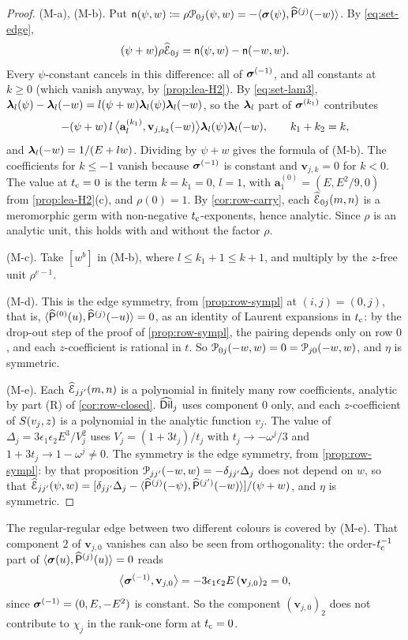 \begin{proof}
(M-a), (M-b). Put $\mathsf{n}(\psi,w)\coloneqq\rho\mathcal{P}_{0j}(\psi,w)=-\langle\boldsymbol{\sigma}(\psi),\widehat{\mathsf{P}}^{(j)}(-w)\rangle$. By \cref{eq:set-edge},
\[
(\psi+w)\rho\widehat{\mathcal{E}}_{0j}=\mathsf{n}(\psi,w)-\mathsf{n}(-w,w).
\]
Every $\psi$-constant cancels in this difference: all of $\boldsymbol{\sigma}^{(-1)}$, and all constants at $k\ge0$ (which vanish anyway, by \cref{prop:lea-H2}). By \cref{eq:set-lam3}, $\boldsymbol{\lambda}_l(\psi)-\boldsymbol{\lambda}_l(-w)=l(\psi+w)\boldsymbol{\lambda}_l(\psi)\boldsymbol{\lambda}_l(-w)$, so the $\boldsymbol{\lambda}_l$ part of $\boldsymbol{\sigma}^{(k_1)}$ contributes
\[
-(\psi+w)\,l\,\bigl\langle\mathbf{a}_l^{(k_1)},\mathbf{v}_{j,k_2}(-w)\bigr\rangle\boldsymbol{\lambda}_l(\psi)\boldsymbol{\lambda}_l(-w),\qquad k_1+k_2=k,
\]
and $\boldsymbol{\lambda}_l(-w)=1/(E+lw)$. Dividing by $\psi+w$ gives the formula of (M-b). The coefficients for $k\le-1$ vanish because $\boldsymbol{\sigma}^{(-1)}$ is constant and $\mathbf{v}_{j,k}=0$ for $k<0$. The value at $t_{\mathrm{c}}=0$ is the term $k=k_1=0$, $l=1$, with $\mathbf{a}_1^{(0)}=(E,E^2/9,0)$ from \cref{prop:lea-H2}(c), and $\rho(0)=1$. By \cref{cor:row-carry}, each $\widehat{\mathcal{E}}_{0j}(m,n)$ is a meromorphic germ with non-negative $t_{\mathrm{c}}$-exponents, hence analytic. Since $\rho$ is an analytic unit, this holds with and without the factor $\rho$.

(M-c). Take $[w^b]$ in (M-b), where $l\le k_1+1\le k+1$, and multiply by the $z$-free unit $\rho^{e-1}$.

(M-d). This is the edge symmetry, from \cref{prop:row-sympl} at $(i,j)=(0,j)$, that is, $\langle\widehat{\mathsf{P}}^{(0)}(u),\widehat{\mathsf{P}}^{(j)}(-u)\rangle=0$, as an identity of Laurent expansions in $t_{\mathrm{c}}$: by the drop-out step of the proof of \cref{prop:row-sympl}, the pairing depends only on row $0$, and each $z$-coefficient is rational in $t$. So $\mathcal{P}_{0j}(-w,w)=0=\mathcal{P}_{j0}(-w,w)$, and $\eta$ is symmetric.

(M-e). Each $\widehat{\mathcal{E}}_{jj'}(m,n)$ is a polynomial in finitely many row coefficients, analytic by part (R) of \cref{cor:row-closed}. $\widehat{\mathsf{Dil}}_j$ uses component $0$ only, and each $z$-coefficient of $S(v_j,z)$ is a polynomial in the analytic function $v_j$. The value of $\Delta_j=3\epsilon_1\epsilon_2E^3/V_j^2$ uses $V_j=(1+3t_j)/t_j$ with $t_j\to-\omega^j/3$ and $1+3t_j\to1-\omega^j\neq0$. The symmetry is the edge symmetry, from \cref{prop:row-sympl}: by that proposition $\mathcal{P}_{jj'}(-w,w)=-\delta_{jj'}\Delta_j$ does not depend on $w$, so that $\widehat{\mathcal{E}}_{jj'}(\psi,w)=[\delta_{jj'}\Delta_j-\langle\widehat{\mathsf{P}}^{(j)}(-\psi),\widehat{\mathsf{P}}^{(j')}(-w)\rangle]/(\psi+w)$, and $\eta$ is symmetric.
\end{proof}

\begin{rmk}
The regular-regular edge between two different colours is covered by (M-e). That component $2$ of $\mathbf{v}_{j,0}$ vanishes can also be seen from orthogonality: the order-$t_{\mathrm{c}}^{-1}$ part of $\langle\boldsymbol{\sigma}(u),\widehat{\mathsf{P}}^{(j)}(u)\rangle=0$ reads
\[
\bigl\langle\boldsymbol{\sigma}^{(-1)},\mathbf{v}_{j,0}\bigr\rangle=-3\epsilon_1\epsilon_2E\,(\mathbf{v}_{j,0})_2=0,
\]
since $\boldsymbol{\sigma}^{(-1)}=(0,E,-E^2)$ is constant. So the component $(\mathbf{v}_{j,0})_2$ does not contribute to $\chi_j$ in the rank-one form at $t_{\mathrm{c}}=0$.
\end{rmk}

